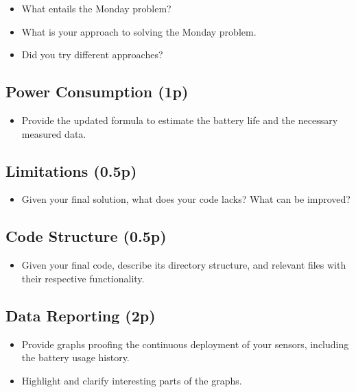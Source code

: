\documentclass[A4,10pt]{article}
\begin{document}
\begin{itemize}[noitemsep]
	\item What entails the Monday problem?
	\item What is your approach to solving the Monday problem.
	\item Did you try different approaches?
\end{itemize}
 
\subsection{Power Consumption (1p)}

\begin{itemize}
	\item Provide the updated formula to estimate the battery life and the necessary measured data.
\end{itemize}

\subsection{Limitations (0.5p)}

\begin{itemize}
	\item Given your final solution, what does your code lacks? What can be improved?
\end{itemize}

\subsection{Code Structure (0.5p)}

\begin{itemize}
	\item Given your final code, describe its directory structure, and relevant files with their respective functionality.
\end{itemize}
 
\subsection{Data Reporting (2p)}

\begin{itemize}
	\item Provide graphs proofing the continuous deployment of your sensors, including the battery usage history. 
	\item Highlight and clarify interesting parts of the graphs.
\end{itemize}
\end{document}
